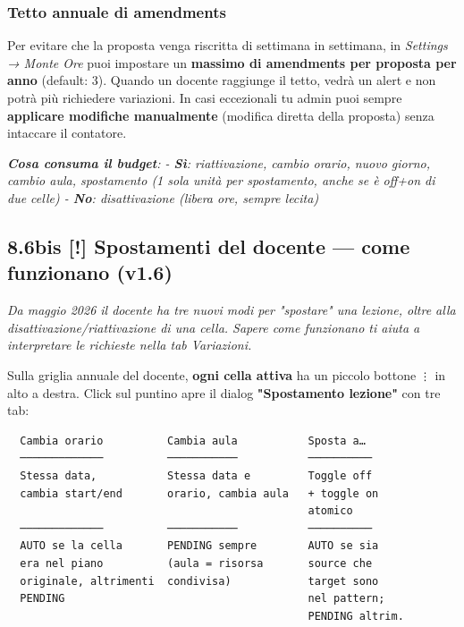 \documentclass[11pt,a4paper]{article}
\renewenvironment{quote}
  {\begin{list}{}{%
      \setlength{\leftmargin}{8pt}%
      \setlength{\rightmargin}{8pt}%
      \setlength{\topsep}{6pt}%
      \setlength{\parsep}{0pt}}%
      \item\relax\color{black!75}\itshape}
  {\end{list}}
\begin{document}
\subsubsection{Tetto annuale di amendments}


Per evitare che la proposta venga riscritta di settimana in settimana, in \textit{Settings → Monte Ore} puoi impostare un \textbf{massimo di amendments per proposta per anno} (default: 3). Quando un docente raggiunge il tetto, vedrà un alert e non potrà più richiedere variazioni. In casi eccezionali tu admin puoi sempre \textbf{applicare modifiche manualmente} (modifica diretta della proposta) senza intaccare il contatore.

\begin{quote}
\textbf{Cosa consuma il budget}:  - \textbf{Sì}: riattivazione, cambio orario, nuovo giorno, cambio aula, spostamento (1 sola unità per spostamento, anche se è off+on di due celle) - \textbf{No}: disattivazione (libera ore, sempre lecita)
\end{quote}

\subsection{8.6bis \textbf{[!]} Spostamenti del docente --- come funzionano (v1.6)}


\begin{quote}
Da maggio 2026 il docente ha tre nuovi modi per "spostare" una lezione, oltre alla disattivazione/riattivazione di una cella. Sapere come funzionano ti aiuta a interpretare le richieste nella tab Variazioni.
\end{quote}

Sulla griglia annuale del docente, \textbf{ogni cella attiva} ha un piccolo bottone \texttt{⋮} in alto a destra. Click sul puntino apre il dialog \textbf{"Spostamento lezione"} con tre tab:

\begin{lstlisting}
  Cambia orario          Cambia aula           Sposta a…
  ─────────────          ───────────           ──────────
  Stessa data,           Stessa data e         Toggle off
  cambia start/end       orario, cambia aula   + toggle on
                                               atomico
  ─────────────          ───────────           ──────────
  AUTO se la cella       PENDING sempre        AUTO se sia
  era nel piano          (aula = risorsa       source che
  originale, altrimenti  condivisa)            target sono
  PENDING                                      nel pattern;
                                               PENDING altrim.
\end{lstlisting}
\end{document}
